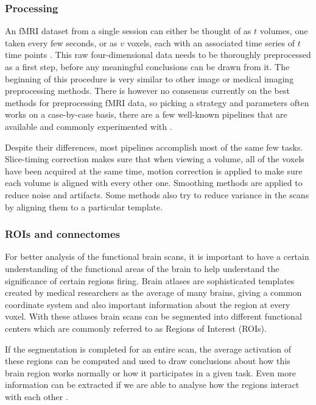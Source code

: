 		
		\subsubsection{Processing}
		
		An fMRI dataset from a single session can either be thought of as $t$ volumes, one taken every few seconds, or as $v$ voxels, each with an associated time series of $t$ time points \cite{smith2004overview}. This raw four-dimensional data needs to be thoroughly preprocessed as a first step, before any meaningful conclusions can be drawn from it. The beginning of this procedure is very similar to other image or medical imaging preprocessing methods. There is however no consensus currently on the best methods for preprocessing fMRI data, so picking a strategy and parameters often works on a case-by-case basis, there are a few well-known pipelines that are available and commonly experimented with \cite{strother2006evaluating}.
		
		Despite their differences, most pipelines accomplish most of the same few tasks. Slice-timing correction makes sure that when viewing a volume, all of the voxels have been acquired at the same time, motion correction is applied to make sure each volume is aligned with every other one. Smoothing methods are applied to reduce noise and artifacts. Some methods also try to reduce variance in the scans by aligning them to a particular template.
		
		\subsubsection{ROIs and connectomes}
		
		For better analysis of the functional brain scans, it is important to have a certain understanding of the functional areas of the brain to help understand the significance of certain regions firing. Brain atlases are sophisticated templates created by medical researchers as the average of many brains, giving a common coordinate system and also important information about the region at every voxel. With these atlases brain scans can be segmented into different functional centers which are commonly referred to as Regions of Interest (ROIs). 
		
		If the segmentation is completed for an entire scan, the average activation of these regions can be computed and used to draw conclusions about how this brain region works normally or how it participates in a given task. Even more information can be extracted if we are able to analyse how the regions interact with each other \cite{rogers2007assessing}. 
		
